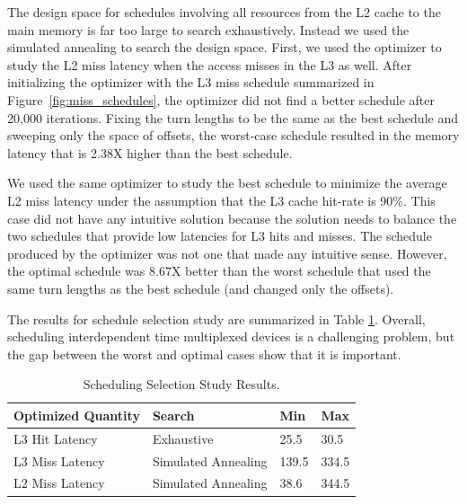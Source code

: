 The design space for schedules involving all resources from the L2 cache to
the main memory is far too large to search exhaustively.
Instead we used the simulated annealing to search the design space.
First, we used the optimizer to study the L2 miss latency when the access misses
in the L3 as well.
After initializing the optimizer with the L3 miss schedule summarized in 
Figure~\ref{fig:miss_schedules}, the optimizer did not find a better schedule 
after 20,000 iterations. Fixing the turn lengths to be the same as the best 
schedule and sweeping only the space of offsets,
the worst-case schedule resulted in the memory latency that is 2.38X
higher than the best schedule.

We used the same optimizer to study the best schedule to minimize the average
L2 miss latency under the assumption that the L3 cache hit-rate is 90\%.
This case did not have any intuitive solution because the solution needs to 
balance the two schedules that provide low latencies for L3 hits and misses.
The schedule 
produced by the optimizer was not one that made any intuitive sense.  However, 
the optimal schedule was 8.67X better than the worst schedule that used the 
same turn lengths as the best schedule (and changed only the offsets).

The results for schedule selection study are summarized in Table 
\ref{tab:coord_results}. Overall, scheduling interdependent time multiplexed 
devices is a challenging problem, but the gap between the worst and optimal 
cases show that it is important.

\begin{table}
    \caption{Scheduling Selection Study Results.}
    \begin{small}
    \centering
    \begin{tabular}{|l|l|l|l|}
        \hline
        \multicolumn{1}{|l|}{Optimized Quantity} & Search & Min & Max \\\hline
        \multicolumn{1}{|l|}{L3 Hit Latency} & Exhaustive & 25.5 & 30.5 
        \\\hline
        \multicolumn{1}{|l|}{L3 Miss Latency} & Simulated Annealing& 139.5 & 
        334.5 \\\hline
        \multicolumn{1}{|l|}{L2 Miss Latency} & Simulated Annealing& 38.6 & 
        344.5 \\\hline
    \end{tabular}
    \end{small}
    \label{tab:coord_results}
\end{table}

